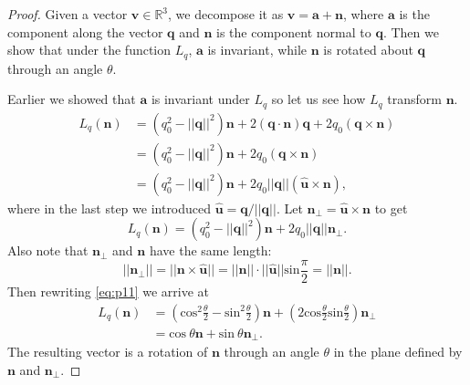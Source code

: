 \begin{proof}
Given a vector $\textbf{v} \in \mathbb{R}^3$, we decompose it as $\textbf{v} = \textbf{a} + \textbf{n}$, where $\textbf{a}$ is the component along the vector $\textbf{q}$ and $\textbf{n}$ is the component normal to $\textbf{q}$. 
Then we show that under the function $L_q$, $\textbf{a}$ is invariant, while $\textbf{n}$ is rotated about $\textbf{q}$ through an angle $\theta$. 

Earlier we showed that $\textbf{a}$ is invariant under $L_q$ so let us see how $L_q$ transform $\textbf{n}$.
\begin{align*}
L_q(\textbf{n}) &= (q_0^2 - ||\textbf{q}||^2)\textbf{n} + 2(\textbf{q} \cdot \textbf{n})\textbf{q} + 2q_0(\textbf{q} \times \textbf{n}) \\
&= (q_0^2 - ||\textbf{q}||^2)\textbf{n} + 2q_0(\textbf{q} \times \textbf{n}) \\
&= (q_0^2 - ||\textbf{q}||^2)\textbf{n} + 2q_0||\textbf{q}||(\mathbf{\hat{u}} \times \textbf{n}),
\end{align*}
where in the last step we introduced $\mathbf{\hat{u}} = \textbf{q}/||\textbf{q}||$.
Let $\textbf{n}_{\bot} = \mathbf{\hat{u}} \times \textbf{n}$ to get
\begin{equation}
L_q(\textbf{n}) = (q_0^2 -||\textbf{q}||^2)\textbf{n} + 2q_0||\textbf{q}||\textbf{n}_{\bot}.
\label{eq:p11}
\end{equation}
Also note that $\textbf{n}_{\bot}$ and $\textbf{n}$ have the same length:
\begin{equation*}
||\textbf{n}_{\bot}|| = ||\textbf{n} \times \mathbf{\hat{u}}|| = ||\textbf{n}|| \cdot ||\mathbf{\hat{u}}||\mbox{sin}\frac{\pi}{2} = ||\textbf{n}||.
\end{equation*}
Then rewriting \eqref{eq:p11} we arrive at
\begin{align*}
L_q(\textbf{n}) &= \left( \mbox{cos}^2 \frac{\theta}{2} - \mbox{sin}^2 \frac{\theta}{2} \right) \textbf{n} + \left( 2\mbox{cos} \frac{\theta}{2} \mbox{sin} \frac{\theta}{2} \right) \textbf{n}_{\bot} \\
&= \mbox{cos}~\theta \textbf{n} + \mbox{sin}~\theta \textbf{n}_{\bot}.
\end{align*}
The resulting vector is a rotation of $\textbf{n}$ through an angle $\theta$ in the plane defined by $\textbf{n}$ and $\textbf{n}_{\bot}$.
\end{proof}















